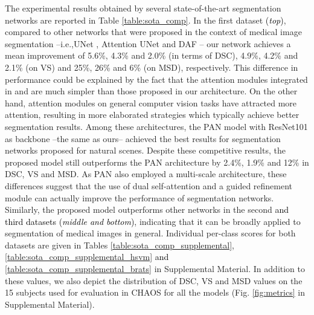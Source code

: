 \documentclass[journal]{IEEEtran}
\begin{document}
The experimental results obtained by several state-of-the-art segmentation networks are reported in Table \ref{table:sota_comp}. In the first dataset \textcolor{black}{(\textit{top})}, compared to other networks that were proposed in the context of medical image segmentation --i.e.,UNet \cite{ronneberger2015u}, Attention UNet \cite{schlemper2019attention} and DAF \cite{wang18d}-- our network achieves a mean improvement of 5.6\%, 4.3\% and 2.0\% (in terms of DSC), 4.9\%, 4.2\% and 2.1\% (on VS) and 25\%, 26\% and 6\% (on MSD), respectively. This difference in performance could be explained by the fact that the attention modules integrated in \cite{wang18d} and \cite{schlemper2019attention} are much simpler than those proposed in our architecture. On the other hand, attention modules on general computer vision tasks have attracted more attention, resulting in more elaborated strategies which typically achieve better segmentation results. Among these architectures, the PAN model \cite{li2018pyramid} with ResNet101 as backbone --the same as ours-- achieved the best results for segmentation networks proposed for natural scenes. Despite these competitive results, the proposed model still outperforms the PAN architecture by 2.4\%, 1.9\% and 12\% in DSC, VS and MSD. As PAN \cite{li2018pyramid} also employed a multi-scale architecture, these differences suggest that the use of dual self-attention and a guided refinement module can actually improve the performance of segmentation networks. Similarly, the proposed model outperforms other networks in the second \textcolor{black}{and third datasets \textcolor{black}{(\textit{middle and bottom})}}, indicating that it can be broadly applied to segmentation of medical images in general. Individual per-class scores for both datasets are given in Tables \ref{table:sota_comp_supplemental}, \ref{table:sota_comp_supplemental_hsvm} \textcolor{black}{and \ref{table:sota_comp_supplemental_brats}} in Supplemental Material. In addition to these values, we also depict the distribution of DSC, VS and MSD values on the 15 subjects used for evaluation in CHAOS for all the models (Fig. \ref{fig:metrics} in Supplemental Material).
\end{document}
